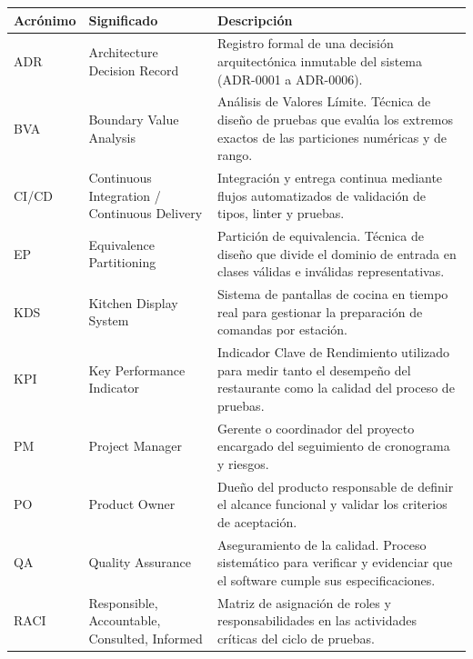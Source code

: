 \documentclass[10pt,a4paper]{article}
\newcounter{none}
\begin{document}
{\def\LTcaptype{none} %
\begin{longtable}[]{@{}
  >{\raggedright\arraybackslash}p{}
  >{\raggedright\arraybackslash}p{}
  >{\raggedright\arraybackslash}p{}@{}}
\toprule\noalign{}
\begin{minipage}[b]{\linewidth}\raggedright
Acrónimo
\end{minipage} & \begin{minipage}[b]{\linewidth}\raggedright
Significado
\end{minipage} & \begin{minipage}[b]{\linewidth}\raggedright
Descripción
\end{minipage} \\
\midrule\noalign{}
\endhead
\bottomrule\noalign{}
\endlastfoot
ADR & Architecture Decision Record & Registro formal de una decisión arquitectónica inmutable del sistema (ADR-0001 a ADR-0006). \\
BVA & Boundary Value Analysis & Análisis de Valores Límite. Técnica de diseño de pruebas que evalúa los extremos exactos de las particiones numéricas y de rango. \\
CI/CD & Continuous Integration / Continuous Delivery & Integración y entrega continua mediante flujos automatizados de validación de tipos, linter y pruebas. \\
EP & Equivalence Partitioning & Partición de equivalencia. Técnica de diseño que divide el dominio de entrada en clases válidas e inválidas representativas. \\
KDS & Kitchen Display System & Sistema de pantallas de cocina en tiempo real para gestionar la preparación de comandas por estación. \\
KPI & Key Performance Indicator & Indicador Clave de Rendimiento utilizado para medir tanto el desempeño del restaurante como la calidad del proceso de pruebas. \\
PM & Project Manager & Gerente o coordinador del proyecto encargado del seguimiento de cronograma y riesgos. \\
PO & Product Owner & Dueño del producto responsable de definir el alcance funcional y validar los criterios de aceptación. \\
QA & Quality Assurance & Aseguramiento de la calidad. Proceso sistemático para verificar y evidenciar que el software cumple sus especificaciones. \\
RACI & Responsible, Accountable, Consulted, Informed & Matriz de asignación de roles y responsabilidades en las actividades críticas del ciclo de pruebas. \\

\end{longtable}}
\end{document}
